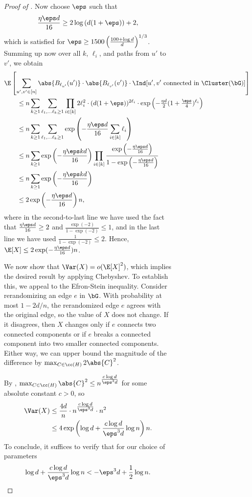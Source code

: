 \documentclass[11pt,letterpaper]{article}
\begin{document}
\begin{figure}
\begin{figure}
\begin{proof}[Proof of ]
    Now choose $\eps$ such that 
    \[
        \frac{\eta \eps d}{16} \ge 2 \log \left( d (1+\eps) \right) + 2, 
    \]
    which is satisfied for $\eps \ge 1500 \left( \frac{100+\log d}{d} \right)^{1/3}$. 
    Summing up now over all $k$, $\ell_i$, and paths from $u'$ to $v'$, we obtain 
    \begin{align*}
        &\E\left[\sum_{u', v' \in [n]} \abs{B_{\ell_{u'}}(u')} \cdot \abs{B_{\ell_{v'}}(v')} \cdot \Ind[u', v' \text{ connected in } \Cluster(\bG)] \right] \\
        &\quad\quad \le n \sum_{k \ge 1} \sum_{\ell_1, \ldots \ell_k \ge 1}  \prod_{i \in [k]} 2\ell_i^2 \cdot (d(1+\eps))^{2\ell_i} \cdot \exp\left(-\tfrac{\eta d}{2}(1+\tfrac{\eps}{4})^{\ell_i}\right) \\
        &\quad\quad \le n \sum_{k \ge 1} \sum_{\ell_1, \ldots \ell_k \ge 1}  \exp\left(-\frac{\eta \eps d}{16} \sum_{i \in [k]} \ell_i\right) \\
        &\quad\quad \le n \sum_{k \ge 1} \exp\left(-\frac{\eta \eps kd}{16}\right) \prod_{i \in [k]} \frac{\exp\left(-\frac{\eta \eps d}{16}\right)}{1 - \exp\left(-\frac{\eta \eps d}{16}\right)} \\
        &\quad\quad \le n \sum_{k \ge 1} \exp\left(-\frac{\eta \eps kd}{16}\right) \\
        &\quad\quad \le 2\exp\left(-\frac{\eta \eps d}{16}\right)n,
    \end{align*}
    where in the second-to-last line we have used the fact that $\frac{\eta \eps d}{16} \ge 2$ and $\tfrac{\exp(-2)}{1-\exp(-2)} \le 1$, and in the last line we have used $\tfrac{1}{1-\exp(-2)} \le 2$.
    Hence, $\E[X] \le 2\exp(-\tfrac{\eta \eps d}{16})n$.

    We now show that $\Var(X) = o(\E[X]^2)$, which implies the desired result by applying Chebyshev. 
    To establish this, we appeal to the Efron-Stein inequality.
    Consider rerandomizing an edge $e$ in $\bG$. 
    With probability at most $1 - 2d/n$, the rerandomized edge $e$ agrees with the original edge, so the value of $X$ does not change. 
    If it disagrees, then $X$ changes only if $e$ connects two connected components or if $e$ breaks a connected component into two smaller connected components.
    Either way, we can upper bound the magnitude of the difference by $\max_{C \in \cc(H)} 2\abs{C}^2$. 
    
    By , $\max_{C \in \cc(H)} \abs{C}^2 \le n^{\tfrac{c\log d}{\eps^3 d}}$ for some absolute constant $c > 0$, so 
    \begin{align*}
        \Var(X) &\le \frac{4d}{n} \cdot n^{\tfrac{c\log d}{\eps^3 d}} \cdot n^2 \\
        &\le 4\exp\left(\log d + \frac{c \log d}{\eps^3 d} \log n\right) n.
    \end{align*}
    To conclude, it suffices to verify that for our choice of parameters 
    \[
        \log d + \frac{c \log d}{\eps^3 d} \log n < -\eps^3 d + \frac{1}{2} \log n.
    \]


\end{proof}
\end{figure}
\end{figure}
\end{document}
